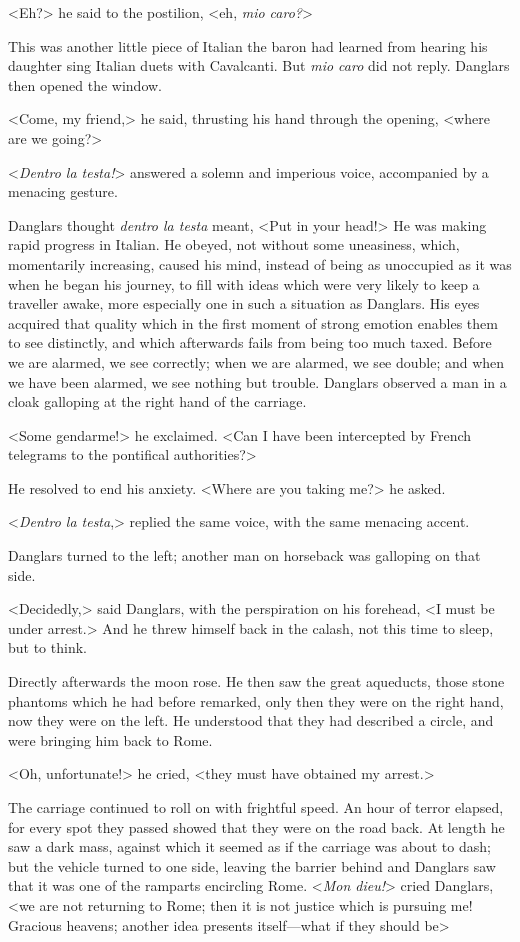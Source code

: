  <Eh?> he said to the postilion, <eh, \textit{mio caro?}> 

 This was another little piece of Italian the baron had learned from hearing his daughter sing Italian duets with Cavalcanti. But \textit{mio caro} did not reply. Danglars then opened the window. 

 <Come, my friend,> he said, thrusting his hand through the opening, <where are we going?> 

 <\textit{Dentro la testa!}> answered a solemn and imperious voice, accompanied by a menacing gesture. 

 Danglars thought \textit{dentro la testa} meant, <Put in your head!> He was making rapid progress in Italian. He obeyed, not without some uneasiness, which, momentarily increasing, caused his mind, instead of being as unoccupied as it was when he began his journey, to fill with ideas which were very likely to keep a traveller awake, more especially one in such a situation as Danglars. His eyes acquired that quality which in the first moment of strong emotion enables them to see distinctly, and which afterwards fails from being too much taxed. Before we are alarmed, we see correctly; when we are alarmed, we see double; and when we have been alarmed, we see nothing but trouble. Danglars observed a man in a cloak galloping at the right hand of the carriage. 

 <Some gendarme!> he exclaimed. <Can I have been intercepted by French telegrams to the pontifical authorities?> 

 He resolved to end his anxiety. <Where are you taking me?> he asked. 

 <\textit{Dentro la testa},> replied the same voice, with the same menacing accent. 

 Danglars turned to the left; another man on horseback was galloping on that side. 

 <Decidedly,> said Danglars, with the perspiration on his forehead, <I must be under arrest.> And he threw himself back in the calash, not this time to sleep, but to think. 

 Directly afterwards the moon rose. He then saw the great aqueducts, those stone phantoms which he had before remarked, only then they were on the right hand, now they were on the left. He understood that they had described a circle, and were bringing him back to Rome. 

 <Oh, unfortunate!> he cried, <they must have obtained my arrest.> 

 The carriage continued to roll on with frightful speed. An hour of terror elapsed, for every spot they passed showed that they were on the road back. At length he saw a dark mass, against which it seemed as if the carriage was about to dash; but the vehicle turned to one side, leaving the barrier behind and Danglars saw that it was one of the ramparts encircling Rome.  <\textit{Mon dieu!}> cried Danglars, <we are not returning to Rome; then it is not justice which is pursuing me! Gracious heavens; another idea presents itself—what if they should be\longdash> 

